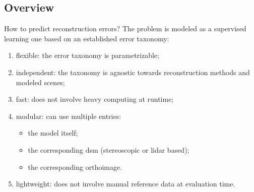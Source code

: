 \documentclass{beamer}
\begin{document}
        \subsection{Overview}
            \begin{frame}{How to predict reconstruction errors?}
                The problem is modeled as a supervised learning one based on an established error taxonomy:
                \begin{enumerate}[label = (\roman*)., font=\color{IGNGreen}]
                    \item<2-> flexible: the error taxonomy is parametrizable;
                    \item<3-> independent: the taxonomy is agnostic towards reconstruction methods and modeled scenes;
                    \item<4-> fast: does not involve heavy computing at runtime;
                    \item<5-> modular: can use multiple entries:
                    \begin{itemize}[label=--]
                        \item<6-> the model itself;
                        \item<7-> the corresponding \gls{dsm} (stereoscopic or \gls{lidar} based);
                        \item<8-> the corresponding orthoimage.
                    \end{itemize}
                    \item<9-> lightweight: does not involve manual reference data at evaluation time.
                \end{enumerate}
            \end{frame}
\end{document}
